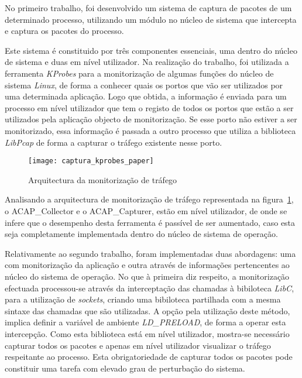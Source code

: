 No primeiro trabalho, foi desenvolvido um sistema de captura de pacotes de um determinado processo, utilizando um módulo no núcleo de sistema que intercepta e captura os pacotes do processo.

Este sistema é constituido por três componentes essenciais, uma dentro do núcleo de sistema e duas em nível utilizador.
Na realização do trabalho, foi utilizada a ferramenta \textit{KProbes} para a monitorização de algumas funções do núcleo de sistema \textit{Linux}, de forma a conhecer quais os portos que vão ser utilizados por uma determinada aplicação.
Logo que obtida, a informação é enviada para um processo em nível utilizador que tem o registo de todos os portos que estão a ser utilizados pela aplicação objecto de monitorização.
Se esse porto não estiver a ser monitorizado, essa informação é passada a outro processo que utiliza a biblioteca \textit{LibPcap} de forma a capturar o tráfego existente nesse porto.


\begin{figure}[h!]
       \centering
       \texttt{[image: captura\_kprobes\_paper]}
       \caption{Arquitectura da monitorização de tráfego}
	\label{fig:paper_capture_kprobes}
\end{figure}


Analisando a arquitectura de monitorização de tráfego representada na figura~\ref{fig:paper_capture_kprobes}, o ACAP\_Collector e o ACAP\_Capturer, estão em nível utilizador, de onde se infere que o desempenho desta ferramenta é passível de ser aumentado, caso esta seja completamente implementada dentro do núcleo de sistema de operação.

Relativamente ao segundo trabalho, foram implementadas duas abordagens: uma com monitorização da aplicação e outra através de informações pertencentes ao núcleo do sistema de operação.
No que à primeira diz respeito, a monitorização efectuada processou-se através da interceptação das chamadas à bibiloteca \textit{LibC}, para a utilização de \textit{sockets}, criando uma bibiloteca partilhada com a mesma sintaxe das chamadas que são utilizadas.
A opção pela utilização deste método, implica definir a variável de ambiente \textit{LD\_PRELOAD}, de forma a operar esta intercepção.
Como esta biblioteca está em nível utilizador, mostra-se necessário capturar todos os pacotes e apenas em nível utilizador visualizar o tráfego respeitante ao processo.
Esta obrigatoriedade de capturar todos os pacotes pode constituir uma tarefa com elevado grau de perturbação do sistema.

